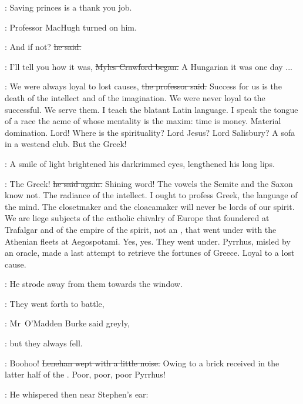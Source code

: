 \jjom:
Saving princes is a thank you job.


:
Professor MacHugh turned on him.

\machugh:
And if not?
\sout{he said.}

\crawford:
I'll tell you how it was,
\sout{Myles Crawford began.}
A Hungarian it was one day
...



\machugh:
We were always loyal to lost causes,
\sout{the professor said.}
Success for us is the death of the intellect and of the imagination.
We were never loyal to the successful.
We serve them.
I teach the blatant Latin language.
I speak the tongue of a race the acme of whose mentality is the maxim:
time is money.
Material domination.
Lord!
Where is the spirituality?
Lord Jesus?
Lord Salisbury?
A sofa in a westend club.
But the Greek!



:
A smile of light brightened his darkrimmed eyes,
lengthened his long lips.

\machugh:
The Greek!
\sout{he said again.}
Shining word!
The vowels the Semite and the Saxon know not.
The radiance of the intellect.
I ought to profess Greek, the language of the mind.
The closetmaker and the cloacamaker will never be lords of our spirit.
We are liege subjects of the catholic chivalry of Europe that foundered at Trafalgar
and of the empire of the spirit,
not an ,
that went under with the Athenian fleets at Aegospotami.
Yes, yes.
They went under.
Pyrrhus,
misled by an oracle,
made a last attempt to retrieve the fortunes of Greece.
Loyal to a lost cause.%

:
He strode away from them towards the window.

\omaddenburke:
They went forth to battle,

:
Mr~O'Madden Burke said greyly,

\omaddenburke:
but they always fell.

\lenehan:
Boohoo!
\sout{Lenehan wept with a little noise.}
Owing to a brick received in the latter half of the .
Poor, poor, poor Pyrrhus!

:
He whispered then near Stephen's ear:



